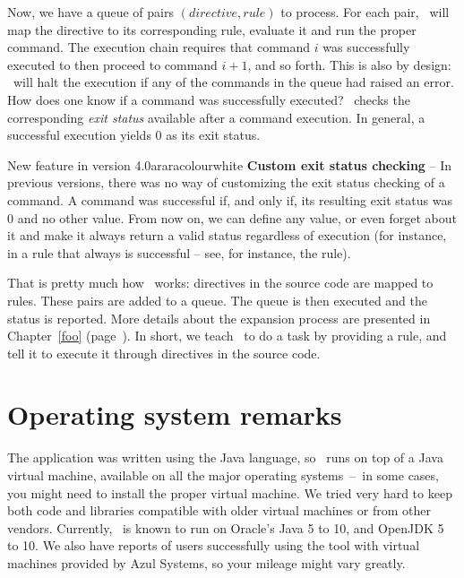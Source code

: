 Now, we have a queue of pairs $(\textit{directive}, \textit{rule})$ to process. For each pair, \arara\ will map the directive to its corresponding rule, evaluate it and run the proper command. The execution chain requires that command $i$ was successfully executed to then proceed to command $i+1$, and so forth. This is also by design: \arara\ will halt the execution if any of the commands in the queue had raised an error. How does one know if a command was successfully executed? \arara\ checks the corresponding \emph{exit status} available after a command execution. In general, a successful execution yields 0 as its exit status.

\begin{messagebox}{New feature in version 4.0}{araracolour}{\icinfo}{white}
\textbf{Custom exit status checking} -- In previous versions, there was no way of customizing the exit status checking of a command. A command was successful if, and only if, its resulting exit status was 0 and no other value. From now on, we can define any value, or even forget about it and make it always return a valid status regardless of execution (for instance, in a rule that always is successful -- see, for instance, the   rule).
\end{messagebox}

That is pretty much how \arara\ works: directives in the source code are mapped to rules. These pairs are added to a queue. The queue is then executed and the status is reported. More details about the expansion process are presented in Chapter~\ref{foo} (page~\pageref{foo}). In short, we teach \arara\ to do a task by providing a rule, and tell it to execute it through directives in the source code.

\section{Operating system remarks}
\label{sec:operatingsystemremarks}

The application was written using the Java language, so \arara\ runs on top of a Java virtual machine, available on all the major operating systems~--~in some cases, you might need to install the proper virtual machine. We tried very hard to keep both code and libraries compatible with older virtual machines or from other vendors. Currently, \arara\ is known to run on Oracle's Java 5 to 10, and OpenJDK 5 to 10. We also have reports of users successfully using the tool with virtual machines provided by Azul Systems, so your mileage might vary greatly.


